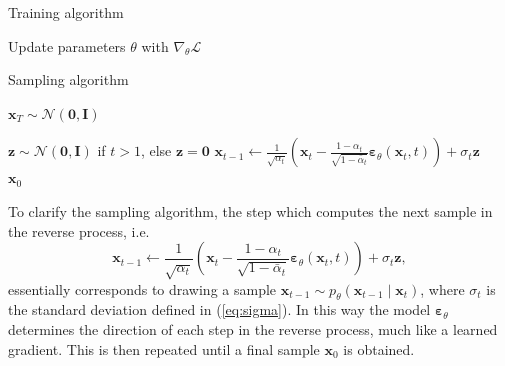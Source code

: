 \documentclass{report}
\begin{document}
\begin{paracol}{2}

\begin{algorithm}[H]
\caption{Training algorithm}\label{alg:train}
\begin{algorithmic}

\Repeat
    \State Update parameters $\theta$ with $\nabla_{\theta}\mathcal{L}$ 


\end{algorithmic}
\end{algorithm}

\switchcolumn

\setcounter{algorithm}{1}
\begin{algorithm}[H]
\caption{Sampling algorithm}\label{alg:samp}
\begin{algorithmic}

\State $\bm{x}_T \sim \mathcal{N}(\bm{0}, \bm{I})$

\State $\bm{z} \sim \mathcal{N}(\bm{0}, \bm{I})$ if $t>1$, else $\bm{z} = \bm{0}$
\State $\bm{x}_{t-1} \gets \frac{1}{\sqrt{\alpha_t}}\left( \bm{x}_t- \frac{1-\alpha_t}{\sqrt{1-\bar{\alpha}_t}} \bm{\varepsilon}_{\theta}(\bm{x}_t, t)\right) + \sigma_t \bm{z}$
\EndFor \\
\Return $\bm{x}_0$

\end{algorithmic}
\end{algorithm}

\end{paracol}

To clarify the sampling algorithm, the step which computes the next sample in the reverse process, i.e.
\begin{equation}
    \bm{x}_{t-1} \gets \frac{1}{\sqrt{\alpha_t}}\left( \bm{x}_t- \frac{1-\alpha_t}{\sqrt{1-\bar{\alpha}_t}} \bm{\varepsilon}_{\theta}(\bm{x}_t, t)\right) + \sigma_t \bm{z},
\end{equation}
essentially corresponds to drawing a sample $\bm{x}_{t-1} \sim p_{\theta}(\bm{x}_{t-1} \mid \bm{x}_t)$, where $\sigma_t$ is the standard deviation defined in (\ref{eq:sigma}).  In this way the model $\bm{\varepsilon}_{\theta}$ determines the direction of each step in the reverse process, much like a learned gradient. This is then repeated until a final sample $\bm{x}_0$ is obtained.
\end{document}
